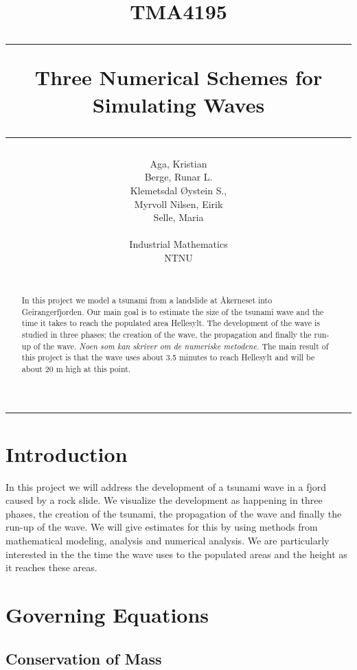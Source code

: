 \documentclass[11pt]{article}
\author{Aga, Kristian \\ Berge, Runar L. \\ Klemetsdal Øystein S.,\\
	Myrvoll Nilsen, Eirik \\ Selle, Maria\\\\
	Industrial Mathematics\\
	NTNU \\\\
}
\title{
TMA4195 \\ \vspace{5pt}
\hrule \vspace{10pt}
       {\Huge \textbf{Three Numerical Schemes for Simulating Waves}}
\vspace{10pt}\hrule\vspace{1cm}
}
\begin{document}
\maketitle
\vspace{1cm}
\hrule
\vspace{0.5cm}
\begin{abstract}
	In this project we model a tsunami from a landslide at Åkerneset into Geirangerfjorden. Our main goal is to estimate the size of the tsunami
	wave and the time it takes to reach the populated area Hellesylt. The development of the wave is studied in three phases; the creation of the wave,
	the propagation and finally the run-up of the wave. \emph{Noen som kan skriver om de numeriske metodene.}
	The main result of this project is that the wave uses about 3.5 minutes to reach Hellesylt and will be about 20 m high at this point. 
\end{abstract}
\clearpage
%
%
\section{Introduction}
In this project we will address the development of a tsunami wave in a fjord caused by a rock slide. We visualize the development as happening in three phases,
the creation of the tsunami, the propagation of the wave and finally the run-up of the wave. We will give estimates for this by using methods from mathematical modeling,
analysis and numerical analysis. We are particularly interested in the the time the wave uses to the populated areas and the height as it reaches these areas.

\section{Governing Equations}

\subsection{Conservation of Mass}
\end{document}
